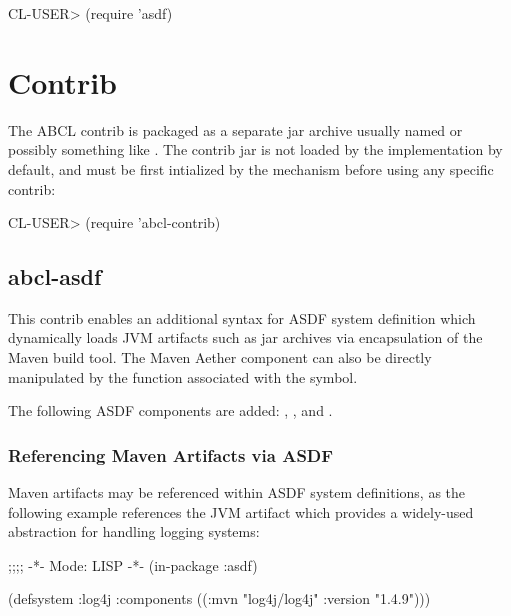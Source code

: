 \documentclass[10pt]{book}
\begin{document}
\begin{listing-lisp}
CL-USER> (require 'asdf)
\end{listing-lisp}

\chapter{Contrib}

The ABCL contrib is packaged as a separate jar archive usually named
 or possibly something like
.  The contrib jar is not loaded by the
implementation by default, and must be first intialized by the
 mechanism before using any specific contrib:

\begin{listing-lisp}
CL-USER> (require 'abcl-contrib)
\end{listing-lisp}

\section{abcl-asdf}

This contrib enables an additional syntax for \textsc{ASDF} system
definition which dynamically loads \textsc{JVM} artifacts such as jar
archives via encapsulation of the Maven build tool.  The Maven Aether
component can also be directly manipulated by the function associated
with the  symbol.



The following \textsc{ASDF} components are added: ,
,  and .


\subsection{Referencing Maven Artifacts via ASDF}

Maven artifacts may be referenced within \textsc{ASDF} system
definitions, as the following example references the
 JVM artifact which provides a widely-used
abstraction for handling logging systems:

\begin{listing-lisp}
    ;;;; -*- Mode: LISP -*-
    (in-package :asdf)

    (defsystem :log4j
      :components ((:mvn "log4j/log4j" 
                    :version "1.4.9")))
\end{listing-lisp}
\end{document}
